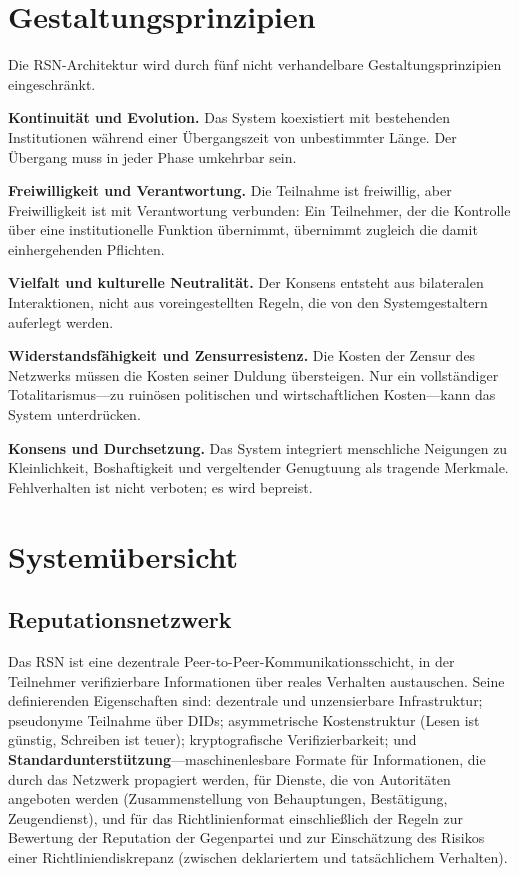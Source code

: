 \documentclass[11pt,a4paper,twocolumn]{article}
\begin{document}
\section{Gestaltungsprinzipien}

Die RSN-Architektur wird durch fünf nicht verhandelbare Gestaltungsprinzipien eingeschränkt.

\textbf{Kontinuität und Evolution.} Das System koexistiert mit bestehenden Institutionen während einer Übergangszeit von unbestimmter Länge. Der Übergang muss in jeder Phase umkehrbar sein.

\textbf{Freiwilligkeit und Verantwortung.} Die Teilnahme ist freiwillig, aber Freiwilligkeit ist mit Verantwortung verbunden: Ein Teilnehmer, der die Kontrolle über eine institutionelle Funktion übernimmt, übernimmt zugleich die damit einhergehenden Pflichten.

\textbf{Vielfalt und kulturelle Neutralität.} Der Konsens entsteht aus bilateralen Interaktionen, nicht aus voreingestellten Regeln, die von den Systemgestaltern auferlegt werden.

\textbf{Widerstandsfähigkeit und Zensurresistenz.} Die Kosten der Zensur des Netzwerks müssen die Kosten seiner Duldung übersteigen. Nur ein vollständiger Totalitarismus---zu ruinösen politischen und wirtschaftlichen Kosten---kann das System unterdrücken.

\textbf{Konsens und Durchsetzung.} Das System integriert menschliche Neigungen zu Kleinlichkeit, Boshaftigkeit und vergeltender Genugtuung als tragende Merkmale. Fehlverhalten ist nicht verboten; es wird bepreist.

\section{Systemübersicht}

\subsection{Reputationsnetzwerk}

Das RSN ist eine dezentrale Peer-to-Peer-Kommunikationsschicht, in der Teilnehmer verifizierbare Informationen über reales Verhalten austauschen. Seine definierenden Eigenschaften sind: dezentrale und unzensierbare Infrastruktur; pseudonyme Teilnahme über DIDs; asymmetrische Kostenstruktur (Lesen ist günstig, Schreiben ist teuer); kryptografische Verifizierbarkeit; und \textbf{Standardunterstützung}---maschinenlesbare Formate für Informationen, die durch das Netzwerk propagiert werden, für Dienste, die von Autoritäten angeboten werden (Zusammenstellung von Behauptungen, Bestätigung, Zeugendienst), und für das Richtlinienformat einschließlich der Regeln zur Bewertung der Reputation der Gegenpartei und zur Einschätzung des Risikos einer Richtliniendiskrepanz (zwischen deklariertem und tatsächlichem Verhalten).
\end{document}
